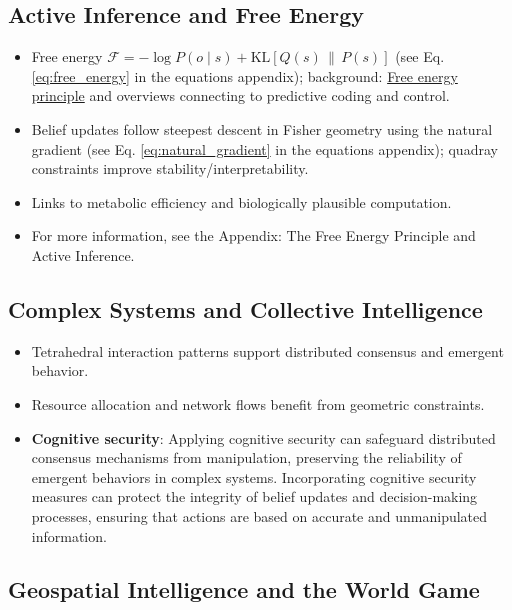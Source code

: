 \documentclass[
  10pt,
]{article}
\providecommand{\tightlist}{%
  \setlength{\itemsep}{0pt}\setlength{\parskip}{0pt}}
\begin{document}
\hypertarget{active-inference-and-free-energy}{%
\subsection{Active Inference and Free
Energy}\label{active-inference-and-free-energy}}

\begin{itemize}
\tightlist
\item
  Free energy
  \(\mathcal{F} = -\log P(o\mid s) + \mathrm{KL}[Q(s)\,\|\,P(s)]\) (see
  Eq. \eqref{eq:free_energy} in the equations appendix); background:
  \href{https://en.wikipedia.org/wiki/Free_energy_principle}{Free energy
  principle} and overviews connecting to predictive coding and control.
\item
  Belief updates follow steepest descent in Fisher geometry using the
  natural gradient (see Eq. \eqref{eq:natural_gradient} in the equations
  appendix); quadray constraints improve stability/interpretability.
\item
  Links to metabolic efficiency and biologically plausible computation.
\item
  For more information, see the Appendix: The Free Energy Principle and
  Active Inference.
\end{itemize}

\hypertarget{complex-systems-and-collective-intelligence}{%
\subsection{Complex Systems and Collective
Intelligence}\label{complex-systems-and-collective-intelligence}}

\begin{itemize}
\tightlist
\item
  Tetrahedral interaction patterns support distributed consensus and
  emergent behavior.
\item
  Resource allocation and network flows benefit from geometric
  constraints.
\item
  \textbf{Cognitive security}: Applying cognitive security can safeguard
  distributed consensus mechanisms from manipulation, preserving the
  reliability of emergent behaviors in complex systems. Incorporating
  cognitive security measures can protect the integrity of belief
  updates and decision-making processes, ensuring that actions are based
  on accurate and unmanipulated information.
\end{itemize}

\hypertarget{geospatial-intelligence-and-the-world-game}{%
\subsection{Geospatial Intelligence and the World
Game}\label{geospatial-intelligence-and-the-world-game}}
\end{document}
